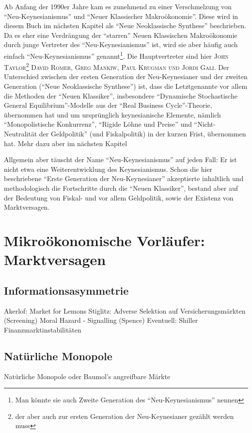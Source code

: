 Ab Anfang der 1990er Jahre kam es zunehmend zu einer Verschmelzung von "`Neu-Keynesianismus"' und "`Neuer Klassischer Makroökonomie"'. Diese wird in diesem Buch im nächsten Kapitel als "`Neue Neoklassische Synthese"' beschrieben. Da es eher eine Verdrängung der "`starren"' Neuen Klassischen Makroökonomie durch junge Vertreter des "`Neu-Keynesianismus"' ist, wird sie aber häufig auch einfach "`Neu-Keynesianismus"' genannt\footnote{Man könnte sie auch Zweite Generation des "`Neu-Keynesianismus"' nennen}. Die Hauptvertreter sind hier \textsc{John Taylor}\footnote{der aber auch zur ersten Generation der Neu-Keynesianer gezählt werden muss} \textsc{David Romer, Greg Mankiw, Paul Krugman und Jordi Gal\i}. Der Unterschied zwischen der ersten Generation der Neu-Keynesianer und der zweiten Generation ("`Neue Neoklassische Synthese"') ist, dass die Letztgenannte vor allem die Methoden der "`Neuen Klassiker"', insbesondere "`Dynamische Stochastische General Equilibrium"'-Modelle aus der "`Real Business Cycle"'-Theorie, übernommen hat und um ursprünglich keynesianische Elemente, nämlich "`Monopolistische Konkurrenz"', "`Rigide Löhne und Preise"' und "`Nicht-Neutralität der Geldpolitik"' (und Fiskalpolitik) in der kurzen Frist, übernommen hat. Mehr dazu aber im nächsten Kapitel

Allgemein aber täuscht der Name "`Neu-Keynesianismus"' auf jeden Fall: Er ist nicht etwa eine Weiterentwicklung des Keynesianismus. Schon die hier beschriebene "`Erste Generation der Neu-Keynesianer"' akzeptierte inhaltlich und methodologisch die Fortschritte durch die "`Neuen Klassiker"', bestand aber auf der Bedeutung von Fiskal- und vor allem Geldpolitik, sowie der Existenz von Marktversagen. 

\section{Mikroökonomische Vorläufer: Marktversagen} \label{cha: Marktversagen}

\subsection{Informationsasymmetrie}
Akerlof: Market for Lemons
Stiglitz: Adverse Selektion auf Versicherungsmärkten (Screening)
Moral Hazard - Signalling (Spence)
Eventuell: Shiller Finanzmarktinstabilitäten

\subsection{Natürliche Monopole}
Natürliche Monopole oder Baumol's angreifbare Märkte


